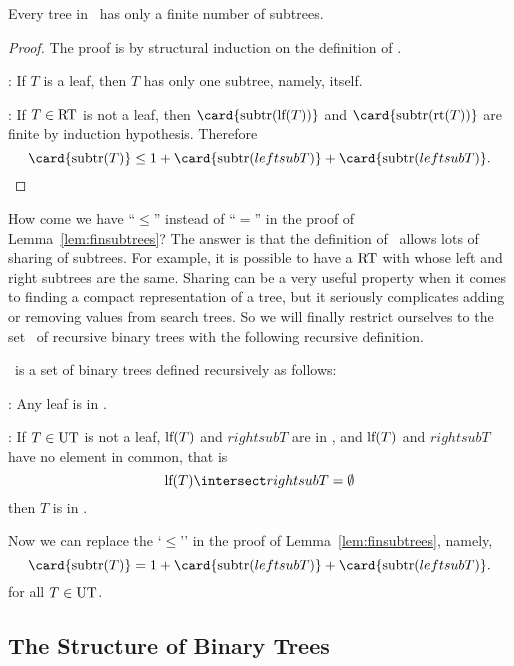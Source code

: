 \begin{lemma}\label{lem:finsubtrees}
Every tree in \rectree\ has only a finite number of subtrees.
\end{lemma}

\begin{proof}
The proof is by structural induction on the definition of \rectree.

: If $T$ is a leaf, then $T$ has only one
subtree, namely, itself.

: If $T \in \text{RT}$ is not a leaf,
then $\card{\subtrees{\leftsub{T}}}$ and $\card{\subtrees{\rightsub{T}}}$ are
finite by induction hypothesis.  Therefore
\[
\card{\subtrees{T}} \leq 1 + \card{\subtrees{leftsub{T}}} +
\card{\subtrees{leftsub{T}}}.
\]
\end{proof}

How come we have ``$\leq$'' instead of ``$=$'' in the proof of
Lemma~\ref{lem:finsubtrees}?  The answer is that the definition of
\rectree\ allows lots of sharing of subtrees.  For example, it is
possible to have a $\text{RT}$ with whose left and right subtrees are
the same.  Sharing can be a very useful property when it comes to
finding a compact representation of a tree, but it seriously
complicates adding or removing values from search trees.  So we will
finally restrict ourselves to the set \ubt\ of 
recursive binary trees with the following recursive definition.

\begin{definition}
\ubt\ is a set of binary trees defined recursively as follows:

:  Any leaf is in \ubt.

: If $T \in \text{UT}$ is not a leaf,
$\text{lf}(T)$ and $rightsub{T}$ are in \ubt, and $\text{lf}(T)$ and
$rightsub{T}$ have no element in common, that is
\[
\leftsub{T} \intersect rightsub{T} = \emptyset
\]
then $T$ is in \ubt.
\end{definition}

Now we can replace the `$\leq$'' in the proof of
Lemma~\ref{lem:finsubtrees}, namely,
\[
\card{\subtrees{T}} = 1 + \card{\subtrees{leftsub{T}}} + \card{\subtrees{leftsub{T}}}.
\]
for all $T \in \text{UT}$.

\subsection{The Structure of Binary Trees}

